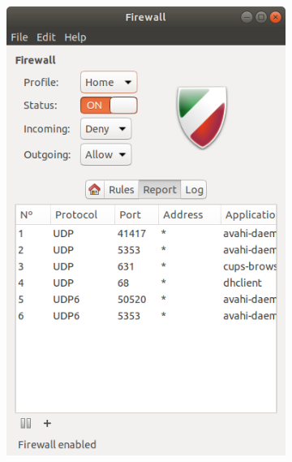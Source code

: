 \documentclass[
	a4paper,
	oneside,
	BCOR = 10mm,
	DIV = 12,
	12pt,
	headings = normal,
]{scrartcl}
\newlength{\gridunitwidth}
\begin{document}
\begin{figure}[!htbp]
\begin{subfigure}[b]{3 \gridunitwidth - 1em / 4}
				\includegraphics[width = \columnwidth]{./assets/03.png}
				\caption{}
				\label{subfig:01-03}
			\end{subfigure}%
			\hspace{0.333333em}%
			\begin{subfigure}[b]{3 \gridunitwidth - 1em / 4}

\end{subfigure}
\end{figure}
\end{document}
